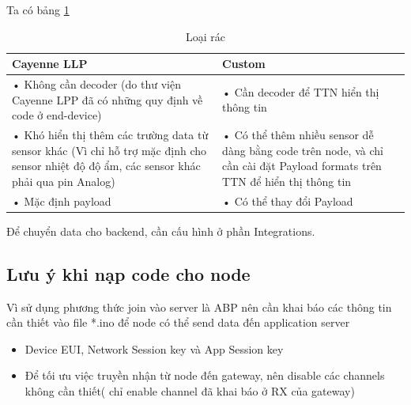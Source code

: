 Ta có bảng \ref{tab.comparison.Cayenne}

\begin{table}[H]
    \centering
    \caption{Loại rác} 
    \label{tab.comparison.Cayenne}
    \begin{tabular}{| m{6cm} | m{6cm} |}
        \hline
        Cayenne LLP & Custom \\

        \hline
        •	Không cần decoder (do thư viện Cayenne LPP đã có những quy định về code ở end-device) & •	Cần decoder để TTN hiển thị thông tin \\
        •	Khó hiển thị thêm các trường data từ sensor khác (Vì chỉ  hỗ trợ mặc định cho sensor nhiệt độ độ ẩm, các sensor khác phải qua pin Analog) & •	Có thể thêm nhiều sensor dễ dàng bằng code trên node, và chỉ cần cài đặt Payload formats trên TTN để hiển thị thông tin \\
        •	Mặc định payload & •	Có thể thay đổi Payload \\
        
        \hline
    \end{tabular}
\end{table}

Để chuyển data cho backend, cần cấu hình ở phần Integrations.



\subsection{Lưu ý khi nạp code cho node}

Vì sử dụng phương thức join vào server là ABP nên cần khai báo các thông tin cần thiết vào file *.ino để node có thể send data đến application server 

\begin{itemize}
    \item Device EUI, Network Session key và App Session key
    \item Để tối ưu việc truyền nhận từ node đến gateway,  nên disable các channels không cần thiết( chỉ enable channel đã khai báo ở RX của gateway)
\end{itemize}



